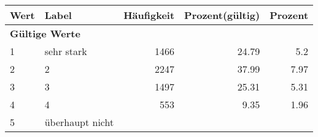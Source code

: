      \begin{longtable}{lXrrr}
     \toprule
     \textbf{Wert} & \textbf{Label} & \textbf{Häufigkeit} & \textbf{Prozent(gültig)} & \textbf{Prozent} \\
     \endhead
     \midrule
     \multicolumn{5}{l}{\textbf{Gültige Werte}}\\

     1 &
     \multicolumn{1}{X}{ sehr stark   } &


       \num{1466} &
       \num[round-mode=places,round-precision=2]{24.79} &
         \num[round-mode=places,round-precision=2]{5.2} \\

     2 &
     \multicolumn{1}{X}{ 2   } &


       \num{2247} &
       \num[round-mode=places,round-precision=2]{37.99} &
         \num[round-mode=places,round-precision=2]{7.97} \\

     3 &
     \multicolumn{1}{X}{ 3   } &


       \num{1497} &
       \num[round-mode=places,round-precision=2]{25.31} &
         \num[round-mode=places,round-precision=2]{5.31} \\

     4 &
     \multicolumn{1}{X}{ 4   } &


       \num{553} &
       \num[round-mode=places,round-precision=2]{9.35} &
         \num[round-mode=places,round-precision=2]{1.96} \\

     5 &
     \multicolumn{1}{X}{ überhaupt nicht   } &



\end{longtable}
